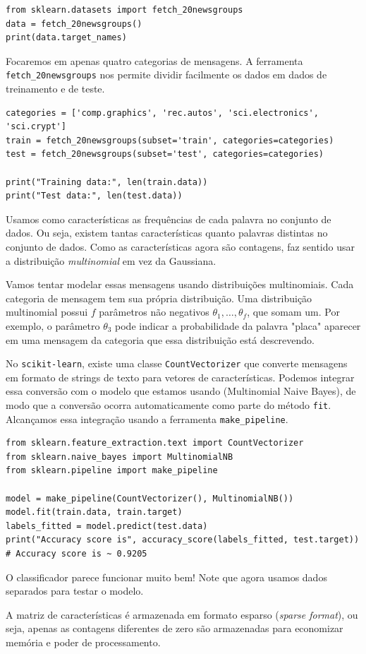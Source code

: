 \documentclass[11pt,a4paper]{article}
\begin{document}
\begin{lstlisting}
from sklearn.datasets import fetch_20newsgroups
data = fetch_20newsgroups()
print(data.target_names)
\end{lstlisting}

Focaremos em apenas quatro categorias de mensagens. A ferramenta \texttt{fetch\_20newsgroups} nos permite dividir facilmente os dados em dados de treinamento e de teste.

\begin{lstlisting}
categories = ['comp.graphics', 'rec.autos', 'sci.electronics', 'sci.crypt']
train = fetch_20newsgroups(subset='train', categories=categories)
test = fetch_20newsgroups(subset='test', categories=categories)

print("Training data:", len(train.data))
print("Test data:", len(test.data))
\end{lstlisting}

Usamos como características as frequências de cada palavra no conjunto de dados. Ou seja, existem tantas características quanto palavras distintas no conjunto de dados. Como as características agora são contagens, faz sentido usar a distribuição \emph{multinomial} em vez da Gaussiana.

Vamos tentar modelar essas mensagens usando distribuições multinomiais. Cada categoria de mensagem tem sua própria distribuição. Uma distribuição multinomial possui $f$ parâmetros não negativos $\theta_1, \dots, \theta_f$, que somam um. Por exemplo, o parâmetro $\theta_3$ pode indicar a probabilidade da palavra "placa" aparecer em uma mensagem da categoria que essa distribuição está descrevendo.

No \texttt{scikit-learn}, existe uma classe \texttt{CountVectorizer} que converte mensagens em formato de strings de texto para vetores de características. Podemos integrar essa conversão com o modelo que estamos usando (Multinomial Naive Bayes), de modo que a conversão ocorra automaticamente como parte do método \texttt{fit}. Alcançamos essa integração usando a ferramenta \texttt{make\_pipeline}.

\begin{lstlisting}
from sklearn.feature_extraction.text import CountVectorizer
from sklearn.naive_bayes import MultinomialNB
from sklearn.pipeline import make_pipeline

model = make_pipeline(CountVectorizer(), MultinomialNB())
model.fit(train.data, train.target)
labels_fitted = model.predict(test.data)
print("Accuracy score is", accuracy_score(labels_fitted, test.target))
# Accuracy score is ~ 0.9205
\end{lstlisting}

O classificador parece funcionar muito bem! Note que agora usamos dados separados para testar o modelo.

A matriz de características é armazenada em formato esparso (\emph{sparse format}), ou seja, apenas as contagens diferentes de zero são armazenadas para economizar memória e poder de processamento.
\end{document}
